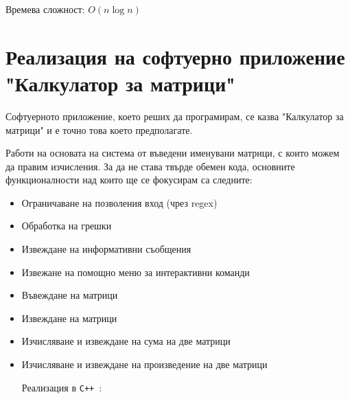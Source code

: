 \documentclass[oneside]{book}
\newcommand*{\cpp}{\texttt{C++}\ }
\begin{document}
Времева сложност: $O(n\log n)$

\chapter*{Реализация на софтуерно приложение "Калкулатор за матрици"}
Софтуерното приложение, което реших да програмирам, се казва "Калкулатор за матрици" и е точно това което предполагате.

Работи на основата на система от въведени именувани матрици, с които можем да правим изчисления.
За да не става твърде обемен кода, основните функционалности над които ще се фокусирам са следните:
\begin{itemize}
    \item Ограничаване на позволения вход (чрез regex)
    \item Обработка на грешки
    \item Извеждане на информативни съобщения
    \item Извежане на помощно меню за интерактивни команди
    \item Въвеждане на матрици
    \item Извеждане на матрици
    \item Изчисляване и извеждане на сума на две матрици
    \item Изчисляване и извеждане на произведение на две матрици
\end{itemize}
\pagebreak
\begin{itemize}\item[Реализация] в \cpp:\end{itemize}\vspace{-12pt}
\end{document}
